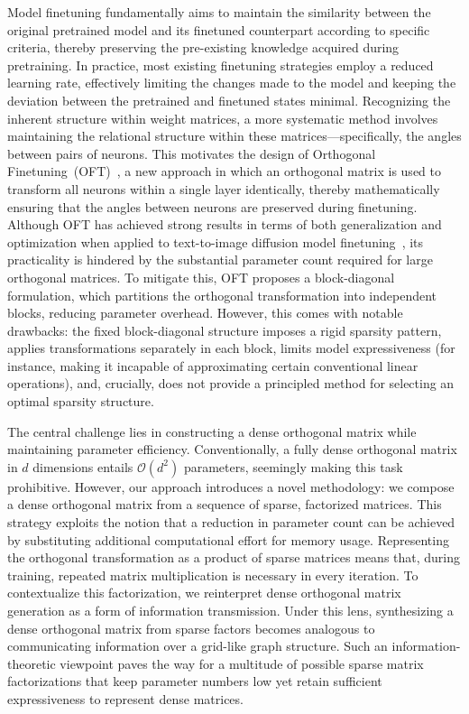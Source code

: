 Model finetuning fundamentally aims to maintain the similarity between the original pretrained model and its finetuned counterpart according to specific criteria, thereby preserving the pre-existing knowledge acquired during pretraining. In practice, most existing finetuning strategies employ a reduced learning rate, effectively limiting the changes made to the model and keeping the deviation between the pretrained and finetuned states minimal. Recognizing the inherent structure within weight matrices, a more systematic method involves maintaining the relational structure within these matrices—specifically, the angles between pairs of neurons. This motivates the design of Orthogonal Finetuning~(OFT)~\cite{qiu2023controlling}, a new approach in which an orthogonal matrix is used to transform all neurons within a single layer identically, thereby mathematically ensuring that the angles between neurons are preserved during finetuning. Although OFT has achieved strong results in terms of both generalization and optimization when applied to text-to-image diffusion model finetuning~\cite{qiu2023controlling}, its practicality is hindered by the substantial parameter count required for large orthogonal matrices. To mitigate this, OFT proposes a block-diagonal formulation, which partitions the orthogonal transformation into independent blocks, reducing parameter overhead. However, this comes with notable drawbacks: the fixed block-diagonal structure imposes a rigid sparsity pattern, applies transformations separately in each block, limits model expressiveness (for instance, making it incapable of approximating certain conventional linear operations), and, crucially, does not provide a principled method for selecting an optimal sparsity structure.

The central challenge lies in constructing a dense orthogonal matrix while maintaining parameter efficiency. Conventionally, a fully dense orthogonal matrix in $d$ dimensions entails $\mathcal{O}(d^2)$ parameters, seemingly making this task prohibitive. However, our approach introduces a novel methodology: we compose a dense orthogonal matrix from a sequence of sparse, factorized matrices. This strategy exploits the notion that a reduction in parameter count can be achieved by substituting additional computational effort for memory usage. Representing the orthogonal transformation as a product of sparse matrices means that, during training, repeated matrix multiplication is necessary in every iteration. To contextualize this factorization, we reinterpret dense orthogonal matrix generation as a form of information transmission. Under this lens, synthesizing a dense orthogonal matrix from sparse factors becomes analogous to communicating information over a grid-like graph structure. Such an information-theoretic viewpoint paves the way for a multitude of possible sparse matrix factorizations that keep parameter numbers low yet retain sufficient expressiveness to represent dense matrices.

